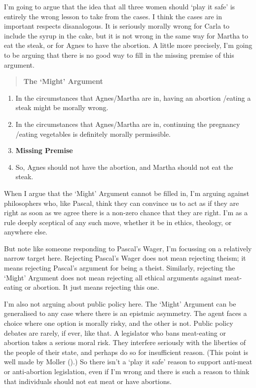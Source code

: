 \documentclass[
  10pt,
  letterpaper,
  DIV=11,
  numbers=noendperiod,
  twoside]{scrartcl}
\providecommand{\tightlist}{%
  \setlength{\itemsep}{0pt}\setlength{\parskip}{0pt}}\usepackage{longtable,booktabs,array}
\begin{document}
I'm going to argue that the idea that all three women should `play it
safe' is entirely the wrong lesson to take from the cases. I think the
cases are in important respects disanalogous. It is seriously morally
wrong for Carla to include the syrup in the cake, but it is not wrong in
the same way for Martha to eat the steak, or for Agnes to have the
abortion. A little more precisely, I'm going to be arguing that there is
no good way to fill in the missing premise of this argument.

\begin{quote}
\textbf{The `Might' Argument}
\end{quote}

\begin{enumerate}
\def\labelenumi{\arabic{enumi}.}
\tightlist
\item
  In the circumstances that Agnes/Martha are in, having an abortion
  /eating a steak might be morally wrong.
\item
  In the circumstances that Agnes/Martha are in, continuing the
  pregnancy /eating vegetables is definitely morally permissible.
\item
  \textbf{Missing Premise}
\item
  So, Agnes should not have the abortion, and Martha should not eat the
  steak.
\end{enumerate}

When I argue that the `Might' Argument cannot be filled in, I'm arguing
against philosophers who, like Pascal, think they can convince us to act
as if they are right as soon as we agree there is a non-zero chance that
they are right. I'm as a rule deeply sceptical of any such move, whether
it be in ethics, theology, or anywhere else.

But note like someone responding to Pascal's Wager, I'm focussing on a
relatively narrow target here. Rejecting Pascal's Wager does not mean
rejecting theism; it means rejecting Pascal's argument for being a
theist. Similarly, rejecting the `Might' Argument does not mean
rejecting all ethical arguments against meat-eating or abortion. It just
means rejecting this one.

I'm also not arguing about public policy here. The `Might' Argument can
be generalised to any case where there is an epistmic asymmetry. The
agent faces a choice where one option is morally risky, and the other is
not. Public policy debates are rarely, if ever, like that. A legislator
who bans meat-eating or abortion takes a serious moral risk. They
interfere seriously with the liberties of the people of their state, and
perhaps do so for insufficient reason. (This point is well made by
Moller ().) So there isn't a `play
it safe' reason to support anti-meat or anti-abortion legislation, even
if I'm wrong and there is such a reason to think that individuals should
not eat meat or have abortions.
\end{document}
